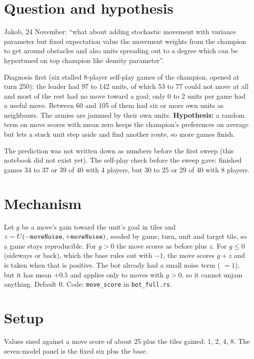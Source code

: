 \documentclass{../polyexp}
\begin{document}

\ExpHeader

\section{Question and hypothesis}
Jakob, 24 November: ``what about adding stochastic movement with variance parameter but fixed expectation value the movement weights from the champion to get around obstacles and also units spreading out to a degree which can be hypertuned on top champion like density parameter''.

Diagnosis first (six stalled 8-player self-play games of the champion, opened at turn 250): the leader had 97 to 142 units, of which 53 to 77 could not move at all and most of the rest had no move toward a goal; only 0 to 2 units per game had a useful move. Between 60 and 105 of them had six or more own units as neighbours. The armies are jammed by their own units. \textbf{Hypothesis:} a random term on move scores with mean zero keeps the champion's preferences on average but lets a stuck unit step aside and find another route, so more games finish.

The prediction was not written down as numbers before the first sweep (this notebook did not exist yet). The self-play check before the sweep gave: finished games 34 to 37 or 39 of 40 with 4 players, but 30 to 25 or 29 of 40 with 8 players.

\section{Mechanism}
Let $g$ be a move's gain toward the unit's goal in tiles and $z \sim U(-\texttt{moveNoise}, +\texttt{moveNoise})$, seeded by game, turn, unit and target tile, so a game stays reproducible. For $g>0$ the move scores as before plus $z$. For $g\le 0$ (sideways or back), which the base rules out with $-1$, the move scores $g + z$ and is taken when that is positive. The bot already had a small noise term ( $=1$), but it has mean $+0.5$ and applies only to moves with $g>0$, so it cannot unjam anything. Default 0. Code: \texttt{move\_score} in \texttt{bot\_full.rs}.

\section{Setup}
Values sized against a move score of about 25 plus the tiles gained: 1, 2, 4, 8. The seven-model panel is the fixed six plus the base.
\end{document}
